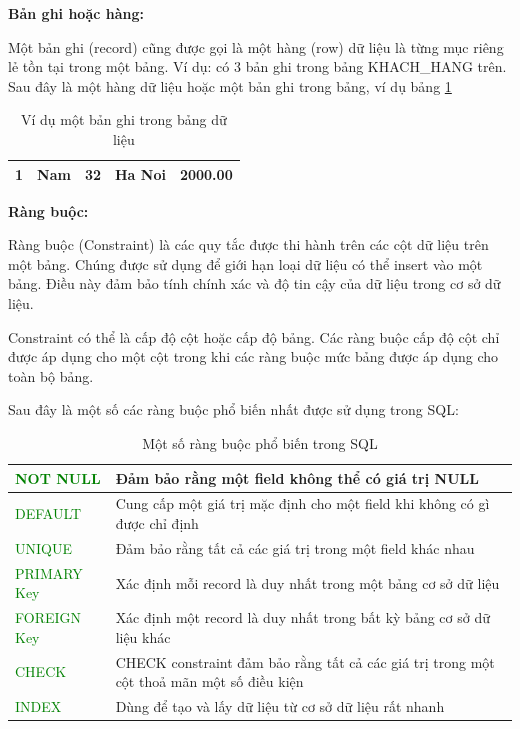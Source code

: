 \textbf{Bản ghi hoặc hàng:}
\par
Một bản ghi (record) cũng được gọi là một hàng (row) dữ liệu là từng mục riêng lẻ tồn tại trong một bảng. Ví dụ: có 3 bản ghi trong bảng KHACH\_HANG trên. Sau đây là một hàng dữ liệu hoặc một bản ghi trong bảng, ví dụ bảng \ref{tab:row_data}

\begin{table}[h!]
    \centering
    \begin{tabular}{ |c|l|r|l|r| } 
     \hline
     1 & Nam & 32 & Ha Noi & 2000.00 \\
     \hline
    \end{tabular}
    \caption{Ví dụ một bản ghi trong bảng dữ liệu}
    \label{tab:row_data}
\end{table}

\textbf{Ràng buộc:}
\par
Ràng buộc (Constraint) là các quy tắc được thi hành trên các cột dữ liệu trên một bảng. Chúng được sử dụng để giới hạn loại dữ liệu có thể insert vào một bảng. Điều này đảm bảo tính chính xác và độ tin cậy của dữ liệu trong cơ sở dữ liệu.
\par
Constraint có thể là cấp độ cột hoặc cấp độ bảng. Các ràng buộc cấp độ cột chỉ được áp dụng cho một cột trong khi các ràng buộc mức bảng được áp dụng cho toàn bộ bảng.
\par
Sau đây là một số các ràng buộc phổ biến nhất được sử dụng trong SQL:

\begin{table}[h]
    \centering
    \begin{tabular}{|l|l|} 
     \hline
     \textcolor{green}{NOT NULL} & Đảm bảo rằng một field không thể có giá trị NULL\\
     \hline
     \textcolor{green}{DEFAULT} & Cung cấp một giá trị mặc định cho một field khi không có gì được chỉ định \\
     \hline
     \textcolor{green}{UNIQUE} & Đảm bảo rằng tất cả các giá trị trong một field  khác nhau\\
     \hline
     \textcolor{green}{PRIMARY Key} & Xác định mỗi record là duy nhất trong một bảng cơ sở dữ liệu\\
     \hline
     \textcolor{green}{FOREIGN Key} & Xác định một record là duy nhất trong bất kỳ bảng cơ sở dữ liệu khác \\
     \hline
     \textcolor{green}{CHECK} & CHECK constraint đảm bảo rằng tất cả các giá trị trong một cột thoả mãn một số điều kiện \\
     \hline
     \textcolor{green}{INDEX} & Dùng để tạo và lấy dữ liệu từ cơ sở dữ liệu rất nhanh\\
     \hline
    \end{tabular}
    \caption{Một số ràng buộc phổ biến trong SQL}
    \label{tab:contrain_data}
\end{table}


